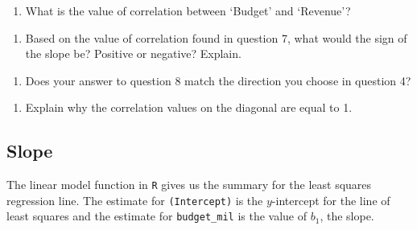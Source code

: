 \documentclass[
]{report}
\newenvironment{Shaded}{\begin{snugshade}}{\end{snugshade}}
\newcommand{\CommentTok}[1]{\textcolor[rgb]{0.56,0.35,0.01}{\textit{#1}}}
\newcommand{\DataTypeTok}[1]{\textcolor[rgb]{0.13,0.29,0.53}{#1}}
\newcommand{\KeywordTok}[1]{\textcolor[rgb]{0.13,0.29,0.53}{\textbf{#1}}}
\newcommand{\NormalTok}[1]{#1}
\newcommand{\OperatorTok}[1]{\textcolor[rgb]{0.81,0.36,0.00}{\textbf{#1}}}
\newcommand{\StringTok}[1]{\textcolor[rgb]{0.31,0.60,0.02}{#1}}
\providecommand{\tightlist}{%
  \setlength{\itemsep}{0pt}\setlength{\parskip}{0pt}}
\begin{document}
\begin{enumerate}
\def\labelenumi{\arabic{enumi}.}
\setcounter{enumi}{6}
\tightlist
\item
  What is the value of correlation between `Budget' and `Revenue'?
\end{enumerate}

\vspace{0.3in}

\begin{enumerate}
\def\labelenumi{\arabic{enumi}.}
\setcounter{enumi}{7}
\tightlist
\item
  Based on the value of correlation found in question 7, what would the sign of the slope be? Positive or negative? Explain.
\end{enumerate}

\vspace{0.5in}

\begin{enumerate}
\def\labelenumi{\arabic{enumi}.}
\setcounter{enumi}{8}
\tightlist
\item
  Does your answer to question 8 match the direction you choose in question 4?
\end{enumerate}

\vspace{0.2in}

\begin{enumerate}
\def\labelenumi{\arabic{enumi}.}
\setcounter{enumi}{9}
\tightlist
\item
  Explain why the correlation values on the diagonal are equal to 1.
\end{enumerate}

\vspace{1in}

\hypertarget{slope}{%
\subsection*{Slope}\label{slope}}

The linear model function in \texttt{R} gives us the summary for the least squares regression line. The estimate for \texttt{(Intercept)} is the \(y\)-intercept for the line of least squares and the estimate for \texttt{budget\_mil} is the value of \(b_1\), the slope.

\begin{Shaded}
\end{Shaded}
\end{document}
